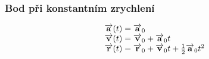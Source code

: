 \documentclass[letterpaper,10pt,english]{jupyterBook}
\begin{document}
\subsubsection{Bod při konstantním zrychlení}
\label{\detokenize{Prednasky/1_2_Kinematika_v_1D:bod-pri-konstantnim-zrychleni}}\begin{equation*}
\begin{split}
\begin{array}{l l}
\overrightarrow{\mathbf{a}}(t) = \overrightarrow{\mathbf{a}}_0 \\
\overrightarrow{\mathbf{v}}(t) = \overrightarrow{\mathbf{v}}_0 + \overrightarrow{\mathbf{a}}_0t \\
\overrightarrow{\mathbf{r}}(t) = \overrightarrow{\mathbf{r}}_0 + \overrightarrow{\mathbf{v}}_0t +
\frac{1}{2}\overrightarrow{\mathbf{a}}_0 t^2
\end{array}
\end{split}
\end{equation*}
\end{document}
